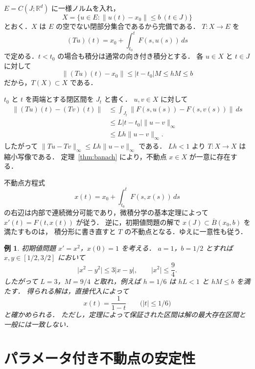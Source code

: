 \documentclass[a5paper,10pt,onecolumn]{jsarticle}
\makeatletter
\theoremstyle{mathnotetheorem}
\newtheorem{example}[theorem]{例}
\renewcommand{\proofname}{証明}
\renewenvironment{proof}[1][\proofname]{%
  \par\pushQED{\qed}\normalfont\topsep4\p@\@plus2\p@\relax
  \trivlist\item[\hskip\labelsep\bfseries #1]\ignorespaces
}{\popQED\endtrivlist\@endpefalse}
\newcommand{\R}{\mathbb{R}}
\newcommand{\norm}[1]{\lVert #1\rVert}
\newcommand{\abs}[1]{\lvert #1\rvert}
\makeatother
\begin{document}
\begin{proof}
$E=C(J;\R^d)$ に一様ノルムを入れ，
\[
 X=\{u\in E:\norm{u(t)-x_0}\le b\ (t\in J)\}
\]
とおく．$X$ は $E$ の空でない閉部分集合であるから完備である．
$T:X\to E$ を
\[
 (Tu)(t)=x_0+\int_{t_0}^{t}F(s,u(s))\,ds
\]
で定める．$t<t_0$ の場合も積分は通常の向き付き積分とする．
各 $u\in X$ と $t\in J$ に対して
\[
 \norm{(Tu)(t)-x_0}\le\abs{t-t_0}M\le hM\le b
\]
だから，$T(X)\subset X$ である．

$t_0$ と $t$ を両端とする閉区間を $J_t$ と書く．
$u,v\in X$ に対して
\begin{align*}
 \norm{(Tu)(t)-(Tv)(t)}
 &\le\int_{J_t}\norm{F(s,u(s))-F(s,v(s))}\,ds\\
 &\le L\abs{t-t_0}\norm{u-v}_{\infty}\\
 &\le Lh\norm{u-v}_{\infty}.
\end{align*}
したがって $\norm{Tu-Tv}_{\infty}\le Lh\norm{u-v}_{\infty}$ である．
$Lh<1$ より $T:X\to X$ は縮小写像である．
定理~\ref{thm:banach} により，不動点 $x\in X$ が一意に存在する．

不動点方程式
\[
 x(t)=x_0+\int_{t_0}^t F(s,x(s))\,ds
\]
の右辺は内部で連続微分可能であり，微積分学の基本定理によって
$x'(t)=F(t,x(t))$ が従う．
逆に，初期値問題の解で $x(J)\subset\overline{B}(x_0,b)$ を満たすものは，
積分形に書き直すと $T$ の不動点となる．ゆえに一意性も従う．
\end{proof}

\begin{example}
初期値問題 $x'=x^2$，$x(0)=1$ を考える．
$a=1$，$b=1/2$ とすれば $x,y\in[1/2,3/2]$ において
\[
 \abs{x^2-y^2}\le3\abs{x-y},\qquad \abs{x^2}\le\frac94.
\]
したがって $L=3$，$M=9/4$ と取れ，例えば $h=1/6$ は
$hL<1$ と $hM\le b$ を満たす．
得られる解は，直接代入によって
\[
 x(t)=\frac{1}{1-t}\qquad\bigl(\abs{t}\le1/6\bigr)
\]
と確かめられる．
ただし，定理によって保証された区間は解の最大存在区間と一般には一致しない．
\end{example}


\section{パラメータ付き不動点の安定性}
\end{document}

